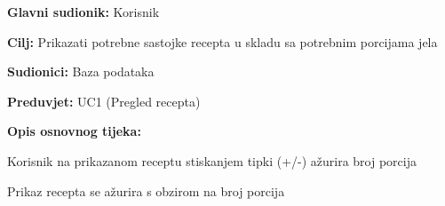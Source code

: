 					\noindent {}
					\begin{packed_item}
						
						\item \textbf{Glavni sudionik: }Korisnik
						\item \textbf{Cilj: }Prikazati potrebne sastojke recepta u skladu sa potrebnim porcijama jela
						\item \textbf{Sudionici: }Baza podataka
						\item \textbf{Preduvjet: }UC1 (Pregled recepta)
						\item \textbf{Opis osnovnog tijeka:}
						
						\item[] \begin{packed_enum}
							\item Korisnik na prikazanom receptu stiskanjem tipki (+/-) ažurira broj porcija
							\item Prikaz recepta se ažurira s obzirom na broj porcija
						\end{packed_enum}
					\end{packed_item}

